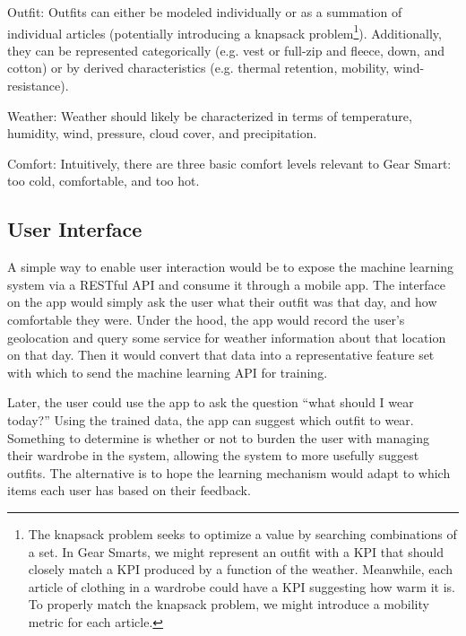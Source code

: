 \begin{description}
  \item{Outfit:} Outfits can either be modeled individually or as a summation of individual articles (potentially introducing
  a knapsack problem\footnote{The knapsack problem seeks to optimize a value by searching combinations of a set. In Gear Smarts,
  we might represent an outfit with a KPI that should closely match a KPI produced by a function of the weather. Meanwhile, each
  article of clothing in a wardrobe could have a KPI suggesting how warm it is. To properly match the knapsack problem, we might
  introduce a mobility metric for each article.}).
  Additionally, they can be represented categorically (e.g. vest or full-zip and
  fleece, down, and cotton) or by derived characteristics (e.g. thermal retention, mobility, wind-resistance).
  \item{Weather:} Weather should likely be characterized in terms of temperature, humidity, wind, pressure,
  cloud cover, and precipitation.
  \item{Comfort:} Intuitively, there are three basic comfort levels relevant to Gear Smart: too cold, comfortable, and too hot.
\end{description}



\subsection{User Interface}
A simple way to enable user interaction would be to expose the machine learning system via a RESTful API and consume it
through a mobile app. The interface on the app would simply ask the user what their outfit was that day, and how comfortable
they were. Under the hood, the app would record the user's geolocation and query some service for weather information
about that location on that day. Then it would convert that data into a representative feature set with which to send
the machine learning API for training.

Later, the user could use the app to ask the question ``what should I wear today?'' Using the trained data, the app can
suggest which outfit to wear. Something to determine is whether or not to burden the user with managing
their wardrobe in the system, allowing the system to more usefully suggest outfits. The alternative is to hope the
learning mechanism would adapt to which items each user has based on their feedback.
